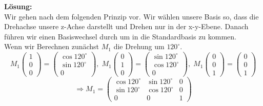 \documentclass[11pt,a4paper,ngerman]{article}
\begin{document}
\begin{enumerate}[\bfseries (a)]
\textbf{Lösung:}\\
Wir gehen nach dem folgenden Prinzip vor. Wir wählen unsere Basis so, dass die Drehachse unsere z-Achse darstellt und Drehen nur in der x-y-Ebene. Danach führen wir einen Basiswechsel durch um in die Standardbasis zu kommen.\\

Wenn wir Berechnen zunächst $M_1$ die Drehung um $120^\circ$.\\
$$
M_1 \left( \begin{array}{c} 1 \\ 0 \\ 0 \end{array} \right) = \left( \begin{array}{c} \cos 120^\circ \\ \sin 120^\circ \\ 0 \end{array} \right), \; M_1 \left( \begin{array}{c} 0 \\ 1 \\ 0 \end{array} \right) = \left( \begin{array}{c} \sin 120^\circ \\ \cos 120^\circ \\ 0 \end{array} \right), \; M_1 \left( \begin{array}{c} 0 \\ 0 \\ 1 \end{array} \right) = \left( \begin{array}{c} 0 \\ 0 \\ 1 \end{array} \right)
$$
$$
\Rightarrow M_1 = \left(
\begin{array}{ccc}
\cos 120^\circ & \sin 120^\circ & 0 \\
\sin 120^\circ & \cos 120^\circ & 0 \\
0 & 0 & 1
\end{array} \right)
$$


\end{enumerate}
\end{document}
